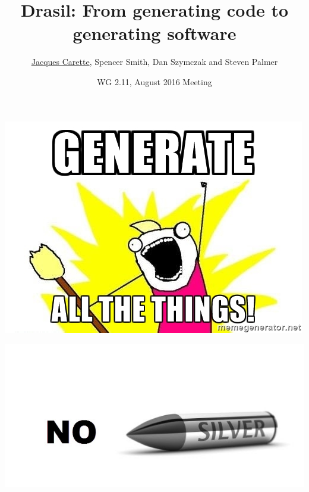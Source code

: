 \documentclass{beamer}
\title[Drasil]{Drasil: From generating code to generating software}
\author{\underline{Jacques Carette}, Spencer Smith, Dan Szymczak and
Steven Palmer}
\institute[McMaster University]{McMaster University}
\date[Aug 2016]{WG 2.11, August 2016 Meeting}
\begin{document}

\begin{frame}
\titlepage
\end{frame}

\begin{frame}
\includegraphics{generate_all_the_things.jpg}
\end{frame}

\begin{frame}
\includegraphics[width=\textwidth]{no_silver_bullet.jpg}
\end{frame}
\end{document}
